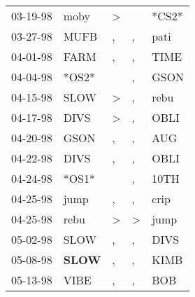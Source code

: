 \begin{supertabular}{p{0.07\textwidth}p{0.06\textwidth}p{0.02\textwidth}p{0.02\textwidth}p{0.06\textwidth}}
          03-19-98\textsuperscript{} &           moby\textsuperscript{} &     \textgreater &                  &                            *CS2* \\
          03-27-98\textsuperscript{} &           MUFB\textsuperscript{} &                , &                , &           pati\textsuperscript{} \\
          04-01-98\textsuperscript{} &           FARM\textsuperscript{} &                , &                , &           TIME\textsuperscript{} \\
          04-04-98\textsuperscript{} &                            *OS2* &                  &                , &           GSON\textsuperscript{} \\
          04-15-98\textsuperscript{} &           SLOW\textsuperscript{} &     \textgreater &                , &           rebu\textsuperscript{} \\
          04-17-98\textsuperscript{} &           DIVS\textsuperscript{} &     \textgreater &                , &           OBLI\textsuperscript{} \\
          04-20-98\textsuperscript{} &           GSON\textsuperscript{} &                , &                , &            AUG\textsuperscript{} \\
          04-22-98\textsuperscript{} &           DIVS\textsuperscript{} &                , &                , &           OBLI\textsuperscript{} \\
          04-24-98\textsuperscript{} &                            *OS1* &                  &                , &           10TH\textsuperscript{} \\
          04-25-98\textsuperscript{} &           jump\textsuperscript{} &                , &                , &           crip\textsuperscript{} \\
          04-25-98\textsuperscript{} &           rebu\textsuperscript{} &     \textgreater &     \textgreater &           jump\textsuperscript{} \\
          05-02-98\textsuperscript{} &           SLOW\textsuperscript{} &                , &                , &           DIVS\textsuperscript{} \\
          05-08-98\textsuperscript{} &  \textbf{SLOW\textsuperscript{}} &                , &                , &           KIMB\textsuperscript{} \\
          05-13-98\textsuperscript{} &           VIBE\textsuperscript{} &                , &                , &            BOB\textsuperscript{} \\

\end{supertabular}
